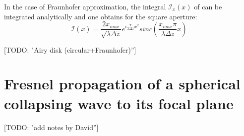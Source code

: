 \documentclass{iucr}              %
\newcommand{\todo}[1]{{\color{red}[TODO: "#1'']}}
\begin{document}
In the case of Fraunhofer approximation, the integral $\mathcal{I}_x(x)$ of \cite{goodmanfourier} can be integrated analytically and one obtains for the square aperture: 
\begin{equation}
\mathcal{I}(x) = \frac{2 x_{max}}{\sqrt{\lambda \Delta z}} e^{i \frac{\pi}{\lambda \Delta z} x^2 } sinc\left( \frac{x_{max}  \pi}{\lambda \Delta z} x \right) 
\end{equation}

\todo{Airy disk (circular+Fraunhofer)}

\section{Fresnel propagation of a spherical collapsing wave to its focal plane}
\todo{add notes by David}








%

% 
% 
% 
% 
\end{document}
